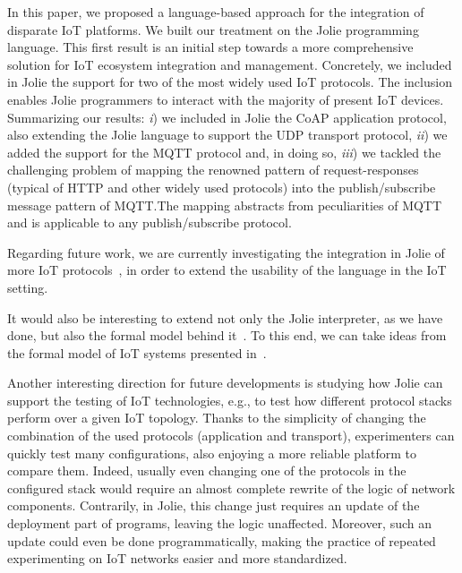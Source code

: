 In this paper, we proposed a language-based approach for the integration of
disparate IoT platforms. We built our treatment on the Jolie programming
language. This first result is an initial step towards a more comprehensive
solution for IoT ecosystem integration and management. Concretely, we included
in Jolie the support for two of the most widely used IoT protocols. The
inclusion enables Jolie programmers to interact with the majority of present IoT
devices. Summarizing our results: \emph{i}) we included in Jolie the CoAP
application protocol, also extending the Jolie language to support the UDP
transport protocol, \emph{ii}) we added the support for the MQTT protocol and,
in doing so, \emph{iii}) we tackled the challenging problem of mapping the
renowned pattern of request-responses (typical of HTTP and other widely used
protocols) into the publish/subscribe message pattern of MQTT.\@ The mapping
abstracts from peculiarities of MQTT and is applicable to any publish/subscribe
protocol.

Regarding future work, we are currently investigating the integration in Jolie
of more IoT protocols~\cite{7123563}, in order to extend the usability of the
language in the IoT setting.

It would also be interesting to extend not only the Jolie interpreter, as we
have done, but also the formal model behind
it~\cite{Guidi2006,MontesiC11,GiallorenzoMG18}. To this end, we can take ideas
from the formal model of IoT systems presented in~\cite{LaneseBF13}.


Another interesting direction for future developments is studying how Jolie
can support the testing of IoT technologies, e.g., to test how
different protocol stacks perform over a given IoT topology. Thanks to the
simplicity of changing the combination of the used protocols (application and
transport), experimenters can quickly test many configurations, also enjoying
a more reliable platform to compare them. Indeed, usually even changing one
of the protocols in the configured stack would require an almost complete
rewrite of the logic of network components. Contrarily, in Jolie, this change
just requires an update of the deployment part of programs, leaving the logic
unaffected. Moreover, such an update could even be done programmatically,
making the practice of repeated experimenting on IoT networks easier and more
standardized.

